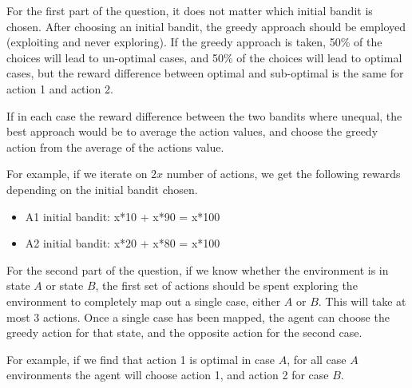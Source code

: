 \documentclass[11pt,onecolumn]{article}
\begin{document}
\begin{enumerate}
    For the first part of the question, it does not matter which initial bandit is chosen. After choosing an initial bandit, the greedy approach should be employed (exploiting and never exploring). If the greedy approach is taken, 50\% of the choices will lead to un-optimal cases, and 50\% of the choices will lead to optimal cases, but the reward difference between optimal and sub-optimal is the same for action 1 and action 2.

    If in each case the reward difference between the two bandits where unequal, the best approach would be to average the action values, and choose the greedy action from the average of the actions value.
    \setlength{\parskip}{6pt}
    
    For example, if we iterate on  $2x$ number of actions, we get the following rewards depending on the initial bandit chosen.
    \begin{itemize}
        \item A1 initial bandit: x*10 + x*90 = x*100
        \item A2 initial bandit: x*20 + x*80 = x*100
    \end{itemize}

    For the second part of the question, if we know whether the environment is in state $A$ or state $B$, the first set of actions should be spent exploring the environment to completely map out a single case, either $A$ or $B$. This will take at most 3 actions. Once a single case has been mapped, the agent can choose the greedy action for that state, and the opposite action for the second case.
    \setlength{\parskip}{6pt}
    
    For example, if we find that action 1 is optimal in case $A$, for all case $A$ environments the agent will choose action 1, and action 2 for case $B$.

\end{enumerate}
\end{document}
